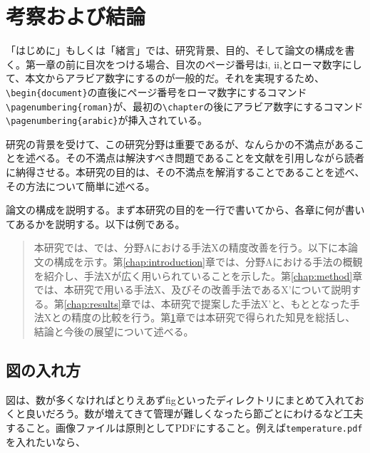 \documentclass[titlepage]{jsreport}
\begin{document}
\chapter{考察および結論} \label{chap:summary}


「はじめに」もしくは「緒言」では、研究背景、目的、そして論文の構成を書く。第一章の前に目次をつける場合、目次のページ番号はi, ii,とローマ数字にして、本文からアラビア数字にするのが一般的だ。それを実現するため、\verb|\begin{document}|の直後にページ番号をローマ数字にするコマンド\verb|\pagenumbering{roman}|が、最初の\verb|\chapter|の後にアラビア数字にするコマンド\verb|\pagenumbering{arabic}|が挿入されている。

研究の背景を受けて、この研究分野は重要であるが、なんらかの不満点があることを述べる。その不満点は解決すべき問題であることを文献を引用しながら読者に納得させる。本研究の目的は、その不満点を解消することであることを述べ、その方法について簡単に述べる。

論文の構成を説明する。まず本研究の目的を一行で書いてから、各章に何が書いてあるかを説明する。以下は例である。

\begin{quotation}
    本研究では、では、分野Aにおける手法Xの精度改善を行う。以下に本論文の構成を示す。第\ref{chap:introduction}章では、分野Aにおける手法の概観を紹介し、手法Xが広く用いられていることを示した。第\ref{chap:method}章では、本研究で用いる手法X、及びその改善手法であるX'について説明する。第\ref{chap:results}章では、本研究で提案した手法X'と、もととなった手法Xとの精度の比較を行う。第\ref{chap:summary}章では本研究で得られた知見を総括し、結論と今後の展望について述べる。
\end{quotation}


\section{図の入れ方}
図は、数が多くなければとりえあずfigといったディレクトリにまとめて入れておくと良いだろう。数が増えてきて管理が難しくなったら節ごとにわけるなど工夫すること。画像ファイルは原則としてPDFにすること。例えば\verb|temperature.pdf|を入れたいなら、
\end{document}
